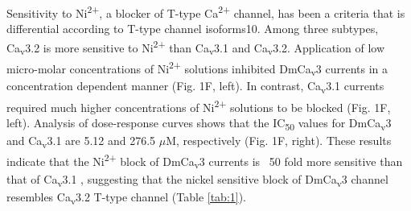 Sensitivity to Ni\textsuperscript{2+}, a blocker of T-type Ca\textsuperscript{2+} channel, has been a criteria that is differential according to T-type channel isoforms10.
Among three subtypes, Ca\textsubscript{v}3.2 is more sensitive to Ni\textsuperscript{2+} than Ca\textsubscript{v}3.1 and Ca\textsubscript{v}3.2.
Application of low micro-molar concentrations of Ni\textsuperscript{2+} solutions inhibited DmCa\textsubscript{v}3 currents in a concentration dependent manner (Fig. 1F, left).
In contrast, Ca\textsubscript{v}3.1 currents required much higher concentrations of Ni\textsuperscript{2+} solutions to be blocked (Fig. 1F, left).
Analysis of dose-response curves shows that the IC\textsubscript{50} values for DmCa\textsubscript{v}3 and Ca\textsubscript{v}3.1 are 5.12 and 276.5 $\mu$M, respectively (Fig. 1F, right).
These results indicate that the Ni\textsuperscript{2+} block of DmCa\textsubscript{v}3 currents is ~50 fold more sensitive than that of Ca\textsubscript{v}3.1 , suggesting that the nickel sensitive block of DmCa\textsubscript{v}3 channel resembles Ca\textsubscript{v}3.2 T-type channel (Table \ref{tab:1}).
    
    
    
    
    
    
    
    